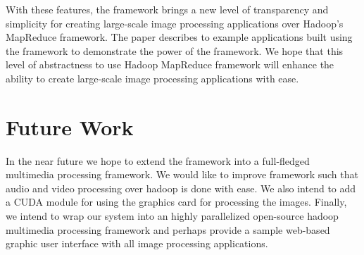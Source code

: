 \documentclass[conference]{IEEEtran}
\begin{document}
With these features, the framework brings a new level of transparency and simplicity for creating large-scale image processing applications over Hadoop's MapReduce framework. The paper describes to example applications built using the framework to demonstrate the power of the framework. We hope that this level of abstractness to use Hadoop MapReduce framework will enhance the ability to create large-scale image processing applications with ease.

\section{Future Work}
In the near future we hope to extend the framework into a full-fledged multimedia processing framework. We would like to improve framework such that audio and video processing over hadoop is done with ease. We also intend to add a CUDA module for using the graphics card for processing the images. Finally, we intend to wrap our system into an highly parallelized open-source hadoop multimedia processing framework and perhaps provide a sample web-based graphic user interface with all image processing applications.  

	
	
\end{document}
